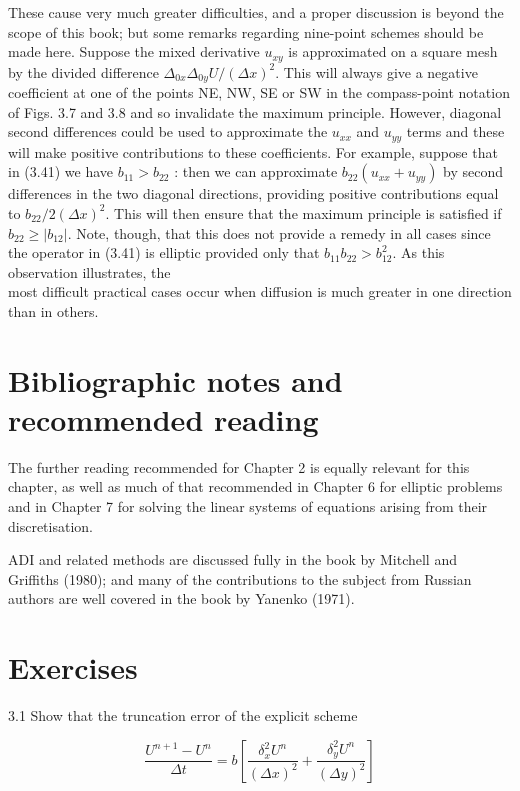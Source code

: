 \documentclass[10pt]{article}
\begin{document}
These cause very much greater difficulties, and a proper discussion is beyond the scope of this book; but some remarks regarding nine-point schemes should be made here. Suppose the mixed derivative \(u_{x y}\) is approximated on a square mesh by the divided difference \(\Delta_{0 x} \Delta_{0 y} U /(\Delta x)^{2}\). This will always give a negative coefficient at one of the points NE, NW, SE or SW in the compass-point notation of Figs. 3.7 and 3.8 and so invalidate the maximum principle. However, diagonal second differences could be used to approximate the \(u_{x x}\) and \(u_{y y}\) terms and these will make positive contributions to these coefficients. For example, suppose that in (3.41) we have \(b_{11}>b_{22}\) : then we can approximate \(b_{22}\left(u_{x x}+u_{y y}\right)\) by second differences in the two diagonal directions, providing positive contributions equal to \(b_{22} / 2(\Delta x)^{2}\). This will then ensure that the maximum principle is satisfied if \(b_{22} \geq\left|b_{12}\right|\). Note, though, that this does not provide a remedy in all cases since the operator in (3.41) is elliptic provided only that \(b_{11} b_{22}>b_{12}^{2}\). As this observation illustrates, the\\
most difficult practical cases occur when diffusion is much greater in one direction than in others.

\section*{Bibliographic notes and recommended reading}
The further reading recommended for Chapter 2 is equally relevant for this chapter, as well as much of that recommended in Chapter 6 for elliptic problems and in Chapter 7 for solving the linear systems of equations arising from their discretisation.

ADI and related methods are discussed fully in the book by Mitchell and Griffiths (1980); and many of the contributions to the subject from Russian authors are well covered in the book by Yanenko (1971).

\section*{Exercises}
3.1 Show that the truncation error of the explicit scheme

\[
\frac{U^{n+1}-U^{n}}{\Delta t}=b\left[\frac{\delta_{x}^{2} U^{n}}{(\Delta x)^{2}}+\frac{\delta_{y}^{2} U^{n}}{(\Delta y)^{2}}\right]
\]
\end{document}

